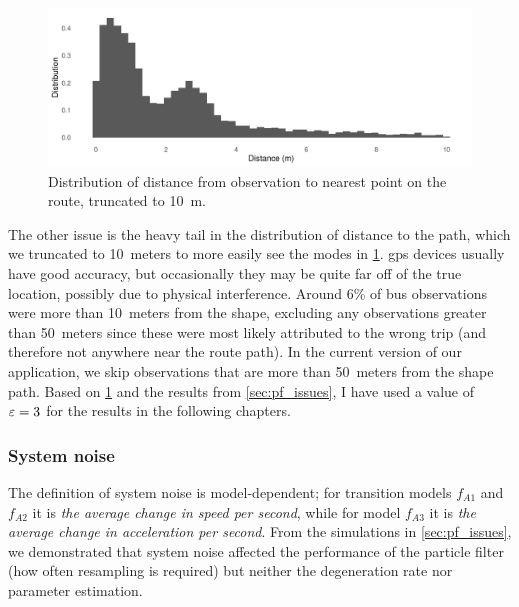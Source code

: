 \begin{knitrout}\small
{}\color{fgcolor}\begin{figure}
\includegraphics[width=\maxwidth]{figure/pf_param_gps-1} \caption[Distribution of distance from observation to route.]{Distribution of distance from observation to nearest point on the route, truncated to 10~m.}\label{fig:pf_param_gps}
\end{figure}


\end{knitrout}

The other issue is the heavy tail in the distribution of distance to the path, which we truncated to 10~meters to more easily see the modes in \cref{fig:pf_param_gps}. \gls{gps} devices usually have good accuracy, but occasionally they may be quite far off of the true location, possibly due to physical interference. Around 6\% of bus observations were more than 10~meters from the shape, excluding any observations greater than 50~meters since these were most likely attributed to the wrong trip (and therefore not anywhere near the route path). In the current version of our application, we skip observations that are more than 50~meters from the shape path. Based on \cref{fig:pf_param_gps} and the results from \cref{sec:pf_issues}, I have used a value of $\varepsilon = 3$ for the results in the following chapters.





\subsubsection{System noise}
\label{sec:pf_params_noise}

The definition of system noise is model-dependent; for transition models $f_{A1}$ and $f_{A2}$ it is \emph{the average change in speed per second}, while for model $f_{A3}$ it is \emph{the average change in acceleration per second}. From the simulations in \cref{sec:pf_issues}, we demonstrated that system noise affected the performance of the particle filter (how often resampling is required) but neither the degeneration rate nor parameter estimation.

